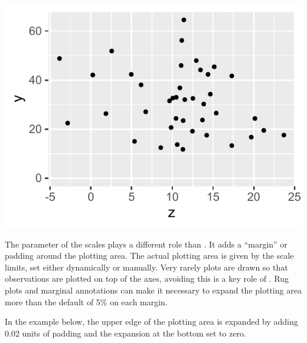 \documentclass[krantz2]{krantz}\usepackage{knitr}
\begin{document}
\begin{knitrout}\footnotesize
{}\color{fgcolor}\begin{kframe}
\begin{alltt}
 \hlopt{+} \hlstd{(} \hlstd{=} \hlstd{,}  \hlstd{=} \hlstd{)}
\end{alltt}
\end{kframe}

{\centering \includegraphics[width=.495\textwidth]{figure/pos-scale-limits-04-1} 

}


\end{knitrout}

The  parameter of the scales plays a different role than . It adds a ``margin'' or padding around the plotting area. The actual plotting area is given by the scale limits, set either dynamically or manually. Very rarely plots are drawn so that observations are plotted on top of the axes, avoiding this is a key role of . Rug plots and marginal annotations can make it necessary to expand the plotting area more than the default of 5\% on each margin.

In the example below, the upper edge of the plotting area is expanded by adding 0.02 units of padding and  the expansion at the bottom set to zero.



\begin{knitrout}\footnotesize
{}\color{fgcolor}\begin{kframe}
\begin{alltt}
 \hlkwb{<-}
  \hlstd{(} 
          \hlstd{=} \hlstd{(}      \hlopt{+}
  \hlstd{(} \hlstd{=} \hlstd{,}  \hlstd{=} \hlstd{)}
\end{alltt}
\end{kframe}
\end{knitrout}
\end{document}

